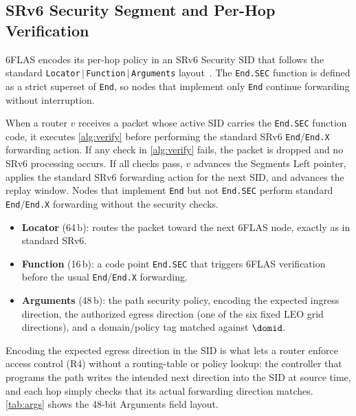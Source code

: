 \subsection{SRv6 Security Segment and Per-Hop Verification}
\label{sec:srv6-bind}

6FLAS encodes its per-hop policy in an SRv6 Security SID that follows the
standard \texttt{Locator$\,|\,$Function$\,|\,$Arguments} layout~\cite{rfc8986}.
The \texttt{End.SEC} function is defined as a strict superset of \texttt{End},
so nodes that implement only \texttt{End} continue forwarding without
interruption.

\begin{definition}
\label{def:endsec}
When a router $v$ receives a packet whose active SID carries the \texttt{End.SEC}
function code, it executes \cref{alg:verify} before performing the standard
SRv6 \texttt{End}/\texttt{End.X} forwarding action. If any check in
\cref{alg:verify} fails, the packet is dropped and no SRv6 processing occurs.
If all checks pass, $v$ advances the Segments Left pointer, applies the standard
SRv6 forwarding action for the next SID, and advances the replay window. Nodes
that implement \texttt{End} but not \texttt{End.SEC} perform standard
\texttt{End}/\texttt{End.X} forwarding without the security checks.
\end{definition}

\begin{itemize}
    \item \textbf{Locator} (64\,b): routes the packet toward the next 6FLAS node,
    exactly as in standard SRv6.
    \item \textbf{Function} (16\,b): a code point \texttt{End.SEC} that triggers
    6FLAS verification before the usual \texttt{End}/\texttt{End.X} forwarding.
    \item \textbf{Arguments} (48\,b): the path security policy, encoding the
    expected ingress direction, the authorized egress direction (one of the six
    fixed LEO grid directions), and a domain/policy tag matched against $\domid$.
\end{itemize}

Encoding the expected egress direction in the SID is what lets a router enforce
access control (R4) without a routing-table or policy lookup: the controller
that programs the path writes the intended next direction into the SID at
source time, and each hop simply checks that its actual forwarding direction
matches. \cref{tab:args} shows the 48-bit Arguments field layout.

